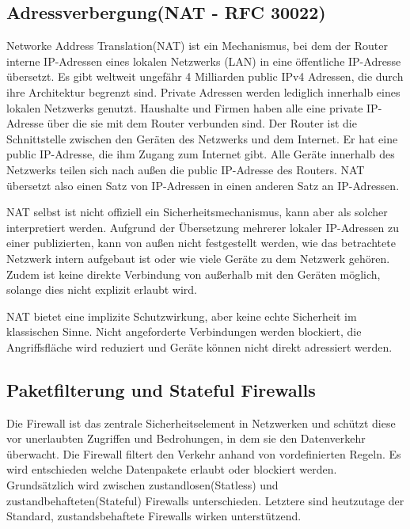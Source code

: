 	\subsection{Adressverbergung(NAT - RFC 30022)}
	\label{sec:NAT}
	Networke Address Translation(NAT) ist ein Mechanismus, bei dem der Router interne 
	IP-Adressen eines lokalen Netzwerks (LAN) in eine öffentliche IP-Adresse übersetzt.
	Es gibt weltweit ungefähr 4 Milliarden public IPv4 Adressen, die durch ihre Architektur begrenzt sind.
	Private Adressen werden lediglich innerhalb eines lokalen Netzwerks genutzt.
	Haushalte und Firmen haben alle eine private IP-Adresse über die sie mit dem Router verbunden sind.
	Der Router ist die Schnittstelle zwischen den Geräten des Netzwerks und dem Internet.
	Er hat eine public IP-Adresse, die ihm Zugang zum Internet gibt. Alle Geräte innerhalb des
	Netzwerks teilen sich nach außen die public IP-Adresse des Routers.
	NAT übersetzt also einen Satz von IP-Adressen in einen anderen Satz an IP-Adressen.

	NAT selbst ist nicht offiziell ein Sicherheitsmechanismus, kann aber als solcher interpretiert werden.
	Aufgrund der Übersetzung mehrerer lokaler IP-Adressen zu einer publizierten, kann von
	außen nicht festgestellt werden, wie das betrachtete Netzwerk intern aufgebaut ist
	oder wie viele Geräte zu dem Netzwerk gehören. Zudem ist keine direkte Verbindung von außerhalb mit
	den Geräten möglich, solange dies nicht explizit erlaubt wird.

	NAT bietet eine implizite Schutzwirkung, aber keine echte Sicherheit im klassischen Sinne.
	Nicht angeforderte Verbindungen werden blockiert, die Angriffsfläche wird reduziert und Geräte können
	nicht direkt adressiert werden. \cite{egevang2001b}

	\subsection{Paketfilterung und Stateful Firewalls}
	\label{sec:Paketfilterung und Stateful Firewalls}
	Die Firewall ist das zentrale Sicherheitselement in Netzwerken und schützt diese vor 
	unerlaubten Zugriffen und Bedrohungen, in dem sie den Datenverkehr überwacht.
	Die Firewall filtert den Verkehr anhand von vordefinierten Regeln.
	Es wird entschieden welche Datenpakete erlaubt oder blockiert werden.
	Grundsätzlich wird zwischen zustandlosen(Statless) und zustandbehafteten(Stateful) Firewalls unterschieden.
	Letztere sind heutzutage der Standard, zustandsbehaftete Firewalls wirken unterstützend.
	
